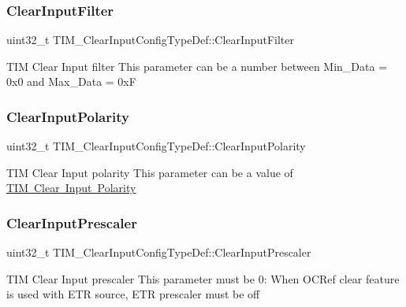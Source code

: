 \subsubsection{\texorpdfstring{ClearInputFilter}{ClearInputFilter}}
{\footnotesize\ttfamily uint32\+\_\+t T\+I\+M\+\_\+\+Clear\+Input\+Config\+Type\+Def\+::\+Clear\+Input\+Filter}

T\+IM Clear Input filter This parameter can be a number between Min\+\_\+\+Data = 0x0 and Max\+\_\+\+Data = 0xF \mbox{\label{struct_t_i_m___clear_input_config_type_def_a49dbc65edc5316822fcabd61cc8409de}} 
\subsubsection{\texorpdfstring{ClearInputPolarity}{ClearInputPolarity}}
{\footnotesize\ttfamily uint32\+\_\+t T\+I\+M\+\_\+\+Clear\+Input\+Config\+Type\+Def\+::\+Clear\+Input\+Polarity}

T\+IM Clear Input polarity This parameter can be a value of \mbox{\hyperlink{group___t_i_m___clear_input___polarity}{T\+IM Clear Input Polarity}} \mbox{\label{struct_t_i_m___clear_input_config_type_def_a509cecb64fec71391ddc8b4703e09cfe}} 
\subsubsection{\texorpdfstring{ClearInputPrescaler}{ClearInputPrescaler}}
{\footnotesize\ttfamily uint32\+\_\+t T\+I\+M\+\_\+\+Clear\+Input\+Config\+Type\+Def\+::\+Clear\+Input\+Prescaler}

T\+IM Clear Input prescaler This parameter must be 0\+: When O\+C\+Ref clear feature is used with E\+TR source, E\+TR prescaler must be off \mbox{\label{struct_t_i_m___clear_input_config_type_def_a776d2f14021a82e022468fd46594b8a0}} 
